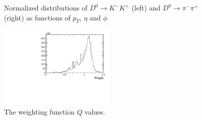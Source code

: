 \documentclass{article}
\begin{document}
        \begin{figure}[h!]
                \centering
                \caption{Normalized distributions of $D^0\to K^-K^+$ (left) and $D^0\to \pi^-\pi^+$ (right) as functions of $p_T$, $\eta$ and $\phi$}
        \end{figure}

        \begin{figure}[h!]
                \centering
                \includegraphics[width = 0.5\textwidth]{../work/RapidSimAnalysis/WeightingFunction/Plots/Weights.pdf}
                \caption{The weighting function $Q$ values.}
        \end{figure}

        \pagebreak
        \nocite{*}
        \printbibliography[notcategory=cited]
\end{document}
